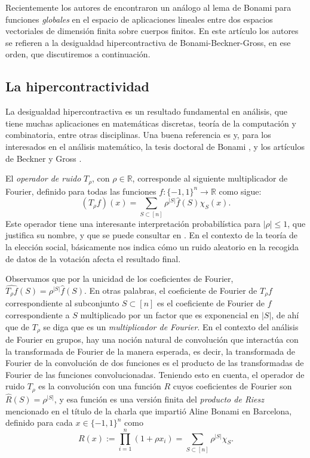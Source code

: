 \documentclass[autocontact]{gaceta}
\newcommand{\R}{\mathbb{R}}
\begin{document}
Recientemente los autores de \cite{EKL23} encontraron un análogo al lema de Bonami para funciones \emph{globales} en el espacio de aplicaciones lineales entre dos espacios vectoriales de dimensión finita sobre cuerpos finitos. En este artículo los autores se refieren a la desigualdad hipercontractiva de Bonami-Beckner-Gross, en ese orden, que discutiremos a continuación.

\subsection{La hipercontractividad}\label{sec:hypercontractitvity}

La desigualdad hipercontractiva es un resultado fundamental en análisis, que tiene muchas aplicaciones en matemáticas discretas, teoría de la computación y combinatoria, entre otras disciplinas. Una buena referencia es \cite[capítulo 9 y sección~10.1]{O'Do21} y, para los interesados en el análisis matemático, la tesis doctoral de Bonami \cite{Bon70}, y los artículos de Beckner y Gross \cite{Bec75,Gro75}.

El \emph{operador de ruido} $T_{\rho}$, con $\rho \in \R$, corresponde al siguiente multiplicador de Fourier, definido para todas las funciones $f:\{-1,1\}^n\to\R$ como sigue:
\begin{equation}\label{Trho}
(T_{\rho}f)(x)=\sum_{S\subset [n]} \rho^{|S|} \widehat{f}(S) \chi_S(x).
\end{equation}
Este operador tiene una interesante interpretación probabilística para $|\rho| \leq 1$, que justifica su nombre, y que se puede consultar en \cite[sección 2.4]{O'Do21}. En el contexto de la teoría de la elección social, básicamente nos indica cómo un ruido aleatorio en la recogida de datos de la votación afecta el resultado final.

Observamos que por la unicidad de los coeficientes de Fourier, $\widehat{T_{\rho}f}(S)=\rho^{|S|} \widehat{f}(S)$. En otras palabras, el coeficiente de Fourier de $T_{\rho}f$ correspondiente al subconjunto $S\subset [n]$ es el coeficiente de Fourier de $f$ correspondiente a $S$ multiplicado por un factor que es exponencial en $|S|$, de ahí que de $T_{\rho}$ se diga que
es un \emph{multiplicador de Fourier}. En el contexto del análisis de Fourier en grupos, hay una noción natural de convolución que interactúa con la transformada de Fourier de la manera esperada, es decir, la transformada de Fourier de la convolución de dos funciones es el producto de las transformadas de Fourier de las funciones convolucionadas. Teniendo esto en cuenta, el operador de ruido $T_{\rho}$ es la convolución con una función $R$ cuyos coeficientes de Fourier son $\widehat{R}(S)=\rho^{|S|}$, y esa función es una versión finita del \emph{producto de Riesz} mencionado en el título de la charla que impartió Aline Bonami en Barcelona, definido para cada $x\in\{-1,1\}^n$ como
\[
R(x):=\prod_{i=1}^n (1+\rho x_i)=\sum_{S\subset [n]} \rho^{|S|} \chi_S.
\]
\end{document}
